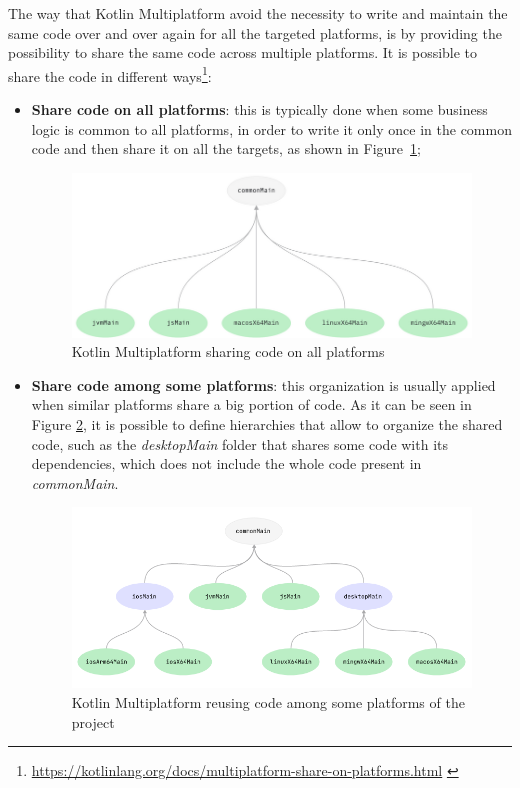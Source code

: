 The way that Kotlin Multiplatform avoid the necessity to write and maintain the same code over and over again for all the targeted platforms, is by providing the possibility to share the same code across multiple platforms.\newline
It is possible to share the code in different ways\footnote{\url{https://kotlinlang.org/docs/multiplatform-share-on-platforms.html} \label{km_share_footnote}}:
\begin{itemize}
    \item \textbf{Share code on all platforms}: this is typically done when some business logic is common to all platforms, in order to write it only once in the common code and then share it on all the targets, as shown in Figure~\ref{fig:km_share_code_on_all_platforms};
    \begin{figure}[!ht]
        \centering
        \includegraphics[scale=0.86]{document/chapters/4-collektive/images/km_share_code_on_all_platforms.png}
        \caption{Kotlin Multiplatform sharing code on all platforms}
        \label{fig:km_share_code_on_all_platforms}
    \end{figure}
    \item \textbf{Share code among some platforms}: this organization is usually applied when similar platforms share a big portion of code. As it can be seen in Figure \ref{fig:km_reuse_code}, it is possible to define hierarchies that allow to organize the shared code, such as the \textit{desktopMain} folder that shares some code with its dependencies, which does not include the whole code present in \textit{commonMain}.
    \begin{figure}[!ht]
        \centering
        \includegraphics[scale=0.97]{document/chapters/4-collektive/images/kotlin_multiplatform_reuse_code.png}
        \caption{Kotlin Multiplatform reusing code among some platforms of the project}
        \label{fig:km_reuse_code}
    \end{figure}
\end{itemize}

